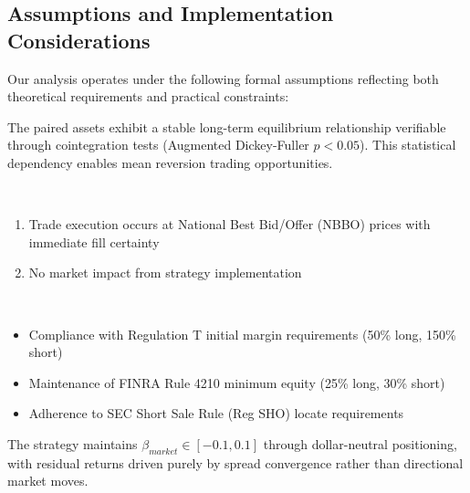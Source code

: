 \subsection{Assumptions and Implementation Considerations}
Our analysis operates under the following formal assumptions reflecting both theoretical requirements and practical constraints:

\begin{assumption} \label{assum:coint}
The paired assets exhibit a stable long-term equilibrium relationship verifiable through cointegration tests (Augmented Dickey-Fuller $p < 0.05$). This statistical dependency enables mean reversion trading opportunities. 
\end{assumption}

\begin{assumption} \label{assum:execution} \
\begin{enumerate}
    \item Trade execution occurs at National Best Bid/Offer (NBBO) prices with immediate fill certainty
    \item No market impact from strategy implementation
\end{enumerate}

\end{assumption}

\begin{assumption} \label{assum:regulation} \
\begin{itemize}
    \item Compliance with Regulation T initial margin requirements (50\% long, 150\% short)
    \item Maintenance of FINRA Rule 4210 minimum equity (25\% long, 30\% short)
    \item Adherence to SEC Short Sale Rule (Reg SHO) locate requirements
\end{itemize}
\end{assumption}

\begin{assumption} \label{assum:neutrality}
The strategy maintains $\beta_{market} \in [-0.1, 0.1]$ through dollar-neutral positioning, with residual returns driven purely by spread convergence rather than directional market moves.
\end{assumption}

